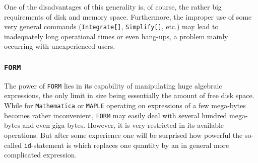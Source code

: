 One of the disadvantages of this generality is, of course, the rather
big requirements of disk and memory space. Furthermore, the improper use
of some very general commands ({\tt Integrate[]}, {\tt Simplify[]},
etc.) may lead to inadequately long operational times or even hang-ups, a
problem mainly occurring with unexperienced users.

\subsubsection{{\tt FORM}}
%
The power of {\tt FORM} lies in its capability of manipulating huge
algebraic expressions, the only limit in size being essentially the
amount of free disk space. While for {\tt Mathematica} or {\tt MAPLE}
operating on expressions of a few mega-bytes becomes rather
inconvenient, {\tt FORM} may easily deal with several hundred mega-bytes
and even giga-bytes. However, it is very restricted in its available
operations.  But after some experience one will be surprised how
powerful the so-called {\tt id}-statement is which replaces one
quantity by an in general more complicated expression.

